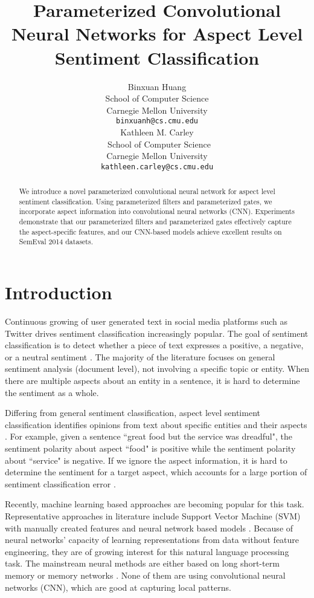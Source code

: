 \documentclass[11pt,a4paper]{article}
\title{Parameterized Convolutional Neural Networks for Aspect Level Sentiment Classification}
\author{Binxuan Huang\\
School of Computer Science\\
Carnegie Mellon University \\
  {\tt binxuanh@cs.cmu.edu} \\\And
  Kathleen M. Carley \\\
School of Computer Science\\
Carnegie Mellon University \\
  {\tt kathleen.carley@cs.cmu.edu} \\}
\date{}
\begin{document}
\maketitle
\begin{abstract}
We introduce a novel parameterized convolutional neural network for aspect level sentiment classification. Using parameterized filters and parameterized gates, we incorporate aspect information into convolutional neural networks (CNN). Experiments demonstrate that our parameterized filters and parameterized gates effectively capture the aspect-specific features, and our CNN-based models achieve excellent results on SemEval 2014 datasets. 
\end{abstract} 

\section{Introduction}

Continuous growing of user generated text in social media platforms such as Twitter drives sentiment classification increasingly popular.
The goal of sentiment classification is to detect whether a piece of text expresses a positive, a negative, or a neutral sentiment \cite{rosenthal2017semeval}. The majority of the literature focuses on general sentiment analysis (document level), not involving a specific topic or entity. When there are multiple aspects about an entity in a sentence, it is hard to determine the sentiment as a whole.

Differing from general sentiment classification, aspect level sentiment classification identifies opinions from text about specific entities and their aspects \cite{pontiki2015semeval}. For example, given a sentence ``great food but the service was dreadful", the sentiment polarity about aspect ``food" is positive while the sentiment polarity about ``service" is negative. If we ignore the aspect information, it is hard to determine the sentiment for a target aspect, which accounts for a large portion of sentiment classification error \cite{jiang2011target}.

Recently, machine learning based approaches are becoming popular for this task. Representative approaches in literature include Support Vector Machine (SVM) with manually created features \cite{jiang2011target,wagner2014dcu} and neural network based models \cite{tang2015effective,wang2016attention,huang2018aspect}. Because of neural networks' capacity of learning representations from data without feature engineering, they are of growing interest for this natural language processing task. The mainstream neural methods are either based on long short-term memory \cite{hochreiter1997long} or memory networks \cite{sukhbaatar2015end}. None of them are using convolutional neural networks (CNN), which are good at capturing local patterns.
\end{document}
